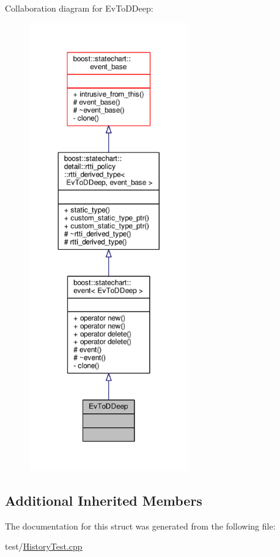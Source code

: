 Collaboration diagram for Ev\+To\+D\+Deep\+:
\nopagebreak
\begin{figure}[H]
\begin{center}
\leavevmode
\includegraphics[height=550pt]{struct_ev_to_d_deep__coll__graph}
\end{center}
\end{figure}
\subsection*{Additional Inherited Members}


The documentation for this struct was generated from the following file\+:\begin{DoxyCompactItemize}
\item 
test/\mbox{\hyperlink{_history_test_8cpp}{History\+Test.\+cpp}}\end{DoxyCompactItemize}
